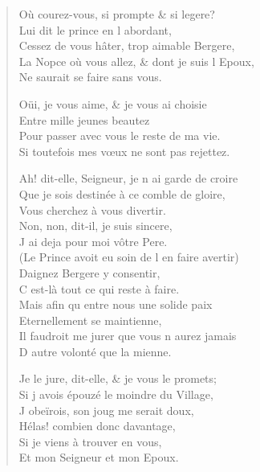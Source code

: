 \begin{verse}
\vin Où courez-vous, si prompte \& si legere? \\
\vin Lui dit le prince en l\textquotesingle{} abordant, \\
Cessez de vous hâter, trop aimable Bergere, \\
La Nopce où vous allez, \& dont je suis l\textquotesingle{} Epoux, \\
\vin Ne saurait se faire sans vous.

\vin Oüi, je vous aime, \& je vous ai choisie \\
\vin Entre mille jeunes beautez \\
Pour passer avec vous le reste de ma vie. \\
Si toutefois mes vœux ne sont pas rejettez.

Ah! dit-elle, Seigneur, je n\textquotesingle{} ai garde de croire \\
Que je sois destinée à ce comble de gloire, \\
\vin Vous cherchez à vous divertir. \\
\vin Non, non, dit-il, je suis sincere, \\
\vin J\textquotesingle{} ai deja pour moi vôtre Pere. \\
(Le Prince avoit eu soin de l\textquotesingle{} en faire avertir) \\
\vin Daignez Bergere y consentir, \\
\vin C\textquotesingle{} est-là tout ce qui reste à faire. \\
Mais afin qu\textquotesingle{} entre nous une solide paix \\
\vin Eternellement se maintienne, \\
Il faudroit me jurer que vous n\textquotesingle{} aurez jamais \\
\vin D\textquotesingle{} autre volonté que la mienne.

Je le jure, dit-elle, \& je vous le promets; \\
Si j\textquotesingle{} avois épouzé le moindre du Village, \\
\vin J\textquotesingle{} obeïrois, son joug me serait doux, \\
\vin Hélas! combien donc davantage, \\
\vin Si je viens à trouver en vous, \\
\vin Et mon Seigneur et mon Epoux.


\end{verse}
